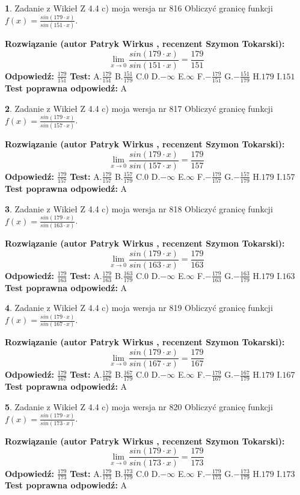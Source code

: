 \documentclass[12pt, a4paper]{article}
\theoremstyle{definition} %
\newtheorem{zad}{}
\newcommand{\zadStart}[1]{\begin{zad}#1\newline}
\newcommand{\zadStop}{\end{zad}}
\newcommand{\rozwStart}[2]{\noindent \textbf{Rozwiązanie (autor #1 , recenzent #2): }\newline}
\newcommand{\rozwStop}{\newline}
\newcommand{\odpStart}{\noindent \textbf{Odpowiedź:}\newline}
\newcommand{\odpStop}{\newline}
\newcommand{\testStart}{\noindent \textbf{Test:}\newline}
\newcommand{\testStop}{\newline}
\newcommand{\kluczStart}{\noindent \textbf{Test poprawna odpowiedź:}\newline}
\newcommand{\kluczStop}{\newline}
\begin{document}
\zadStart{Zadanie z Wikieł Z 4.4 c) moja wersja nr 816}
Obliczyć granicę funkcji $f(x)=\frac{sin(179\cdot x)}{sin(151\cdot x)}$.
\zadStop
\rozwStart{Patryk Wirkus}{Szymon Tokarski}
$$\lim\limits_{x\to 0}\frac{sin(179\cdot x)}{sin(151\cdot x)}=
\frac{179}{151}$$
\rozwStop
\odpStart
$\frac{179}{151}$
\odpStop
\testStart
A.$\frac{179}{151}$
B.$\frac{151}{179}$
C.$0$
D.$-\infty$
E.$\infty$
F.$-\frac{179}{151}$
G.$-\frac{151}{179}$
H.$179$
I.$151$
\testStop
\kluczStart
A
\kluczStop



\zadStart{Zadanie z Wikieł Z 4.4 c) moja wersja nr 817}
Obliczyć granicę funkcji $f(x)=\frac{sin(179\cdot x)}{sin(157\cdot x)}$.
\zadStop
\rozwStart{Patryk Wirkus}{Szymon Tokarski}
$$\lim\limits_{x\to 0}\frac{sin(179\cdot x)}{sin(157\cdot x)}=
\frac{179}{157}$$
\rozwStop
\odpStart
$\frac{179}{157}$
\odpStop
\testStart
A.$\frac{179}{157}$
B.$\frac{157}{179}$
C.$0$
D.$-\infty$
E.$\infty$
F.$-\frac{179}{157}$
G.$-\frac{157}{179}$
H.$179$
I.$157$
\testStop
\kluczStart
A
\kluczStop



\zadStart{Zadanie z Wikieł Z 4.4 c) moja wersja nr 818}
Obliczyć granicę funkcji $f(x)=\frac{sin(179\cdot x)}{sin(163\cdot x)}$.
\zadStop
\rozwStart{Patryk Wirkus}{Szymon Tokarski}
$$\lim\limits_{x\to 0}\frac{sin(179\cdot x)}{sin(163\cdot x)}=
\frac{179}{163}$$
\rozwStop
\odpStart
$\frac{179}{163}$
\odpStop
\testStart
A.$\frac{179}{163}$
B.$\frac{163}{179}$
C.$0$
D.$-\infty$
E.$\infty$
F.$-\frac{179}{163}$
G.$-\frac{163}{179}$
H.$179$
I.$163$
\testStop
\kluczStart
A
\kluczStop



\zadStart{Zadanie z Wikieł Z 4.4 c) moja wersja nr 819}
Obliczyć granicę funkcji $f(x)=\frac{sin(179\cdot x)}{sin(167\cdot x)}$.
\zadStop
\rozwStart{Patryk Wirkus}{Szymon Tokarski}
$$\lim\limits_{x\to 0}\frac{sin(179\cdot x)}{sin(167\cdot x)}=
\frac{179}{167}$$
\rozwStop
\odpStart
$\frac{179}{167}$
\odpStop
\testStart
A.$\frac{179}{167}$
B.$\frac{167}{179}$
C.$0$
D.$-\infty$
E.$\infty$
F.$-\frac{179}{167}$
G.$-\frac{167}{179}$
H.$179$
I.$167$
\testStop
\kluczStart
A
\kluczStop



\zadStart{Zadanie z Wikieł Z 4.4 c) moja wersja nr 820}
Obliczyć granicę funkcji $f(x)=\frac{sin(179\cdot x)}{sin(173\cdot x)}$.
\zadStop
\rozwStart{Patryk Wirkus}{Szymon Tokarski}
$$\lim\limits_{x\to 0}\frac{sin(179\cdot x)}{sin(173\cdot x)}=
\frac{179}{173}$$
\rozwStop
\odpStart
$\frac{179}{173}$
\odpStop
\testStart
A.$\frac{179}{173}$
B.$\frac{173}{179}$
C.$0$
D.$-\infty$
E.$\infty$
F.$-\frac{179}{173}$
G.$-\frac{173}{179}$
H.$179$
I.$173$
\testStop
\kluczStart
A
\kluczStop
\end{document}
